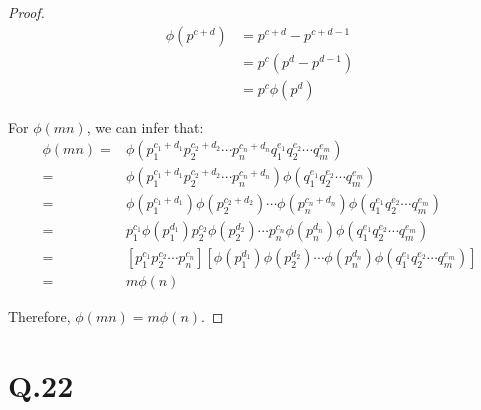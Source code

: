 \documentclass[a4paper,12pt]{article}
\begin{document}
\begin{proof}
\begin{align*}
	\phi(p^{c+d}) &= p^{c+d} - p^{c+d-1} \\
	&= p^c (p^d - p^{d-1}) \\
	&= p^c \phi(p^d)
\end{align*}

For $\phi(mn)$, we can infer that:
\begin{align*}
	\phi(mn) =& \phi(p_1^{c_1+d_1} p_2^{c_2+d_2} \cdots p_n^{c_n+d_n} q_1^{e_1} q_2^{e_2} \cdots q_m^{e_m}) \\
	=& \phi(p_1^{c_1+d_1} p_2^{c_2+d_2} \cdots p_n^{c_n+d_n}) \phi(q_1^{e_1} q_2^{e_2} \cdots q_m^{e_m}) \\
	=& \phi(p_1^{c_1+d_1}) \phi(p_2^{c_2+d_2}) \cdots \phi(p_n^{c_n+d_n}) \phi(q_1^{e_1} q_2^{e_2} \cdots q_m^{e_m}) \\
	=& p_1^{c_1} \phi(p_1^{d_1}) p_2^{c_2} \phi(p_2^{d_2}) \cdots p_n^{c_n} \phi(p_n^{d_n}) \phi(q_1^{e_1} q_2^{e_2} \cdots q_m^{e_m}) \\
	=& [p_1^{c_1} p_2^{c_2} \cdots p_n^{c_n}] [\phi(p_1^{d_1}) \phi(p_2^{d_2}) \cdots \phi(p_n^{d_n}) \phi(q_1^{e_1} q_2^{e_2} \cdots q_m^{e_m})] \\
	=& m \phi(n)
\end{align*}

Therefore, $\phi(mn) = m \phi(n)$.
\end{proof}

\section*{Q.22}
\end{document}
